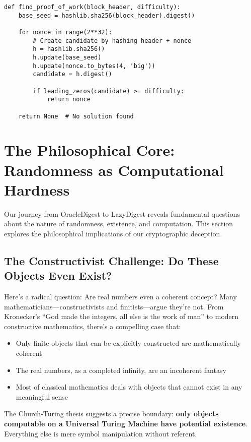 \documentclass[11pt]{article}
\begin{document}
\begin{lstlisting}
def find_proof_of_work(block_header, difficulty):
    base_seed = hashlib.sha256(block_header).digest()
    
    for nonce in range(2**32):
        # Create candidate by hashing header + nonce
        h = hashlib.sha256()
        h.update(base_seed)
        h.update(nonce.to_bytes(4, 'big'))
        candidate = h.digest()
        
        if leading_zeros(candidate) >= difficulty:
            return nonce
    
    return None  # No solution found
\end{lstlisting}

\section{The Philosophical Core: Randomness as Computational Hardness}

Our journey from OracleDigest to LazyDigest reveals fundamental questions about the nature of randomness, existence, and computation. This section explores the philosophical implications of our cryptographic deception.

\subsection{The Constructivist Challenge: Do These Objects Even Exist?}

Here's a radical question: Are real numbers even a coherent concept? Many mathematicians---constructivists and finitists---argue they're not. From Kronecker's ``God made the integers, all else is the work of man'' to modern constructive mathematics, there's a compelling case that:

\begin{itemize}
\item Only finite objects that can be explicitly constructed are mathematically coherent
\item The real numbers, as a completed infinity, are an incoherent fantasy
\item Most of classical mathematics deals with objects that cannot exist in any meaningful sense
\end{itemize}

The Church-Turing thesis suggests a precise boundary: \textbf{only objects computable on a Universal Turing Machine have potential existence}. Everything else is mere symbol manipulation without referent.
\end{document}

